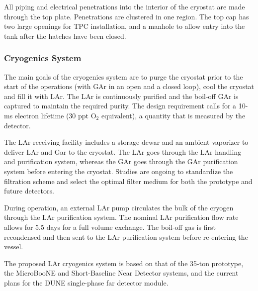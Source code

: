 All piping and electrical penetrations into the interior of the cryostat are made through the top plate.
Penetrations are clustered in one region.
The top cap has two large openings for TPC installation, and a manhole to allow entry into the tank  after the
hatches have been closed.

\subsubsection{Cryogenics System}

The main goals of the %
cryogenics system are to purge the cryostat prior to the start of the operations (with GAr in an open
and a closed loop),  cool the cryostat and fill it with LAr. %
The LAr is continuously purified
and the boil-off GAr is captured  to maintain the required purity.
  The design requirement calls for a 10-ms electron lifetime (30 ppt O$_2$ equivalent), a quantity that is measured by the detector.

The LAr-receiving facility includes a storage dewar and an ambient vaporizer to deliver LAr and Gar to the
cryostat. The LAr goes through the LAr handling and purification system, whereas the GAr goes 
through the GAr purification system before entering the cryostat.
Studies are ongoing to standardize the filtration scheme and select the optimal filter medium for %
both the prototype and future %
detectors. %

During operation, an external LAr pump circulates the bulk of the cryogen through the LAr purification
system. The nominal LAr purification flow rate allows for 5.5 days for a full volume exchange.
The boil-off gas is first recondensed and then sent to the LAr purification system before
re-entering the vessel.

The proposed LAr cryogenics system is based on that of the 35-ton prototype, the MicroBooNE and Short-Baseline Near Detector systems, and the current plans for the DUNE single-phase far detector module.










